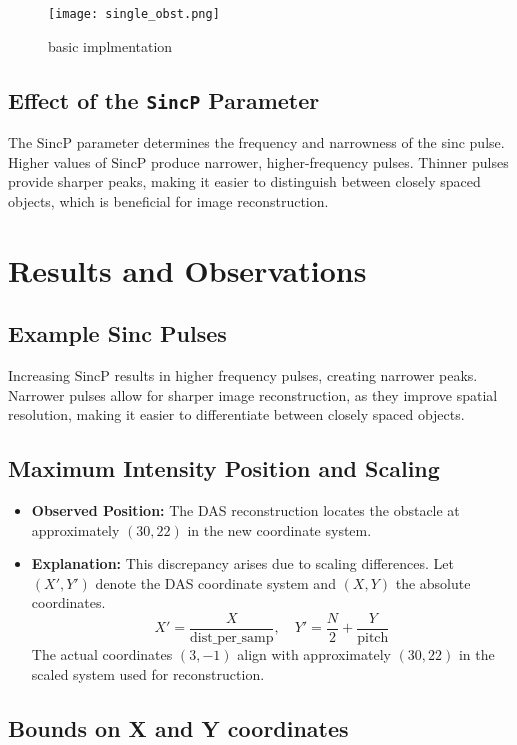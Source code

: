 \documentclass{article}
\begin{document}
\begin{figure}[!h]
	\centering
	\texttt{[image: single\_obst.png]}
    \caption{basic implmentation}
\end{figure}


\subsection{Effect of the \texttt{SincP} Parameter}
The $\text{SincP}$ parameter determines the frequency and narrowness of the sinc pulse. Higher values of $\text{SincP}$ produce narrower, higher-frequency pulses. Thinner pulses provide sharper peaks, making it easier to distinguish between closely spaced objects, which is beneficial for image reconstruction.

\section{Results and Observations}
\subsection{Example Sinc Pulses}
Increasing $\text{SincP}$ results in higher frequency pulses, creating narrower peaks. Narrower pulses allow for sharper image reconstruction, as they improve spatial resolution, making it easier to differentiate between closely spaced objects.

\subsection{Maximum Intensity Position and Scaling}
\begin{itemize}
    \item \textbf{Observed Position:} The DAS reconstruction locates the obstacle at approximately $(30, 22)$ in the new coordinate system.
    \item \textbf{Explanation:} This discrepancy arises due to scaling differences. Let $(X', Y')$ denote the DAS coordinate system and $(X, Y)$ the absolute coordinates.
    \begin{equation}
    X' = \frac{X}{\text{dist\_per\_samp}}, \quad Y' = \frac{N}{2} + \frac{Y}{\text{pitch}}
    \end{equation}
    The actual coordinates $(3, -1)$ align with approximately $(30, 22)$ in the scaled system used for reconstruction.
\end{itemize}

\subsection{Bounds on X and Y coordinates}
\end{document}
